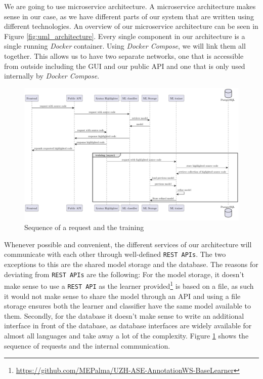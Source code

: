 \documentclass[11pt]{article}
\begin{document}
We are going to use microservice architecture. A microservice architecture makes sense in our case, as we have different parts of our system that are written using different technologies. An overview of our microservice architecture can be seen in Figure \ref{fig:uml_architecture}. Every single component in our architecture is a single running \textit{Docker} container. Using \textit{Docker Compose}, we will link them all together. This allows us to have two separate networks, one that is accessible from outside including the GUI and our public API and one that is only used internally by \textit{Docker Compose}.

\begin{figure}
    \centering
    \includegraphics[width=\linewidth]{illustations/sequence.pdf}
    \caption{Sequence of a request and the training}
    \label{fig:uml_sequence}
\end{figure}

Whenever possible and convenient, the different services of our architecture will communicate with each other through well-defined \texttt{REST APIs}. The two exceptions to this are the shared model storage and the database. The reasons for deviating from \texttt{REST APIs} are the following: For the model storage, it doesn't make sense to use a \texttt{REST API} as the learner provided\footnote{\url{https://github.com/MEPalma/UZH-ASE-AnnotationWS-BaseLearner}} is based on a file, as such it would not make sense to share the model through an API and using a file storage ensures both the learner and classifier have the same model available to them. Secondly, for the database it doesn't make sense to write an additional interface in front of the database, as database interfaces are widely available for almost all languages and take away a lot of the complexity. Figure \ref{fig:uml_sequence} shows the sequence of requests and the internal communication.
\end{document}
